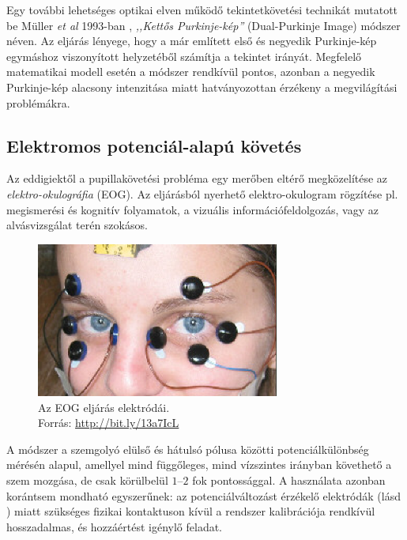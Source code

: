 Egy további lehetséges optikai elven működő tekintetkövetési technikát mutatott be Müller \emph{et al} 1993-ban \cite{muller}, \emph{,,Kettős Purkinje-kép''} (Dual-Purkinje Image) módszer néven. Az eljárás lényege, hogy a már említett első és negyedik Purkinje-kép egymáshoz viszonyított helyzetéből számítja a tekintet irányát. Megfelelő matematikai modell esetén a módszer rendkívül pontos, azonban a negyedik Purkinje-kép alacsony intenzitása miatt hatványozottan érzékeny a megvilágítási problémákra.

\subsection{Elektromos potenciál-alapú követés}\label{sect:potencial}

Az eddigiektől a pupillakövetési probléma egy merőben eltérő megközelítése az \emph{elektro-okulográfia} (EOG). Az eljárásból nyerhető elektro-okulogram rögzítése pl. megismerési és kognitív folyamatok, a vizuális információfeldolgozás, vagy az alvásvizsgálat terén szokásos.

\begin{figure}[!ht]
\centering
\includegraphics[width=80mm, keepaspectratio]{figures/eog.png}
\caption{Az EOG eljárás elektródái.\\Forrás: \url{http://bit.ly/13a7IcL}}
\label{fig:eog}
\end{figure}

A módszer a szemgolyó elülső és hátulsó pólusa közötti potenciálkülönbség mérésén alapul, amellyel mind függőleges, mind vízszintes irányban követhető a szem mozgása, de csak körülbelül $1$--$2$ fok pontossággal. A használata azonban korántsem mondható egyszerűnek: az potenciálváltozást érzékelő elektródák (lásd ) miatt szükséges fizikai kontaktuson kívül a rendszer kalibrációja rendkívül hosszadalmas, és hozzáértést igénylő feladat.

